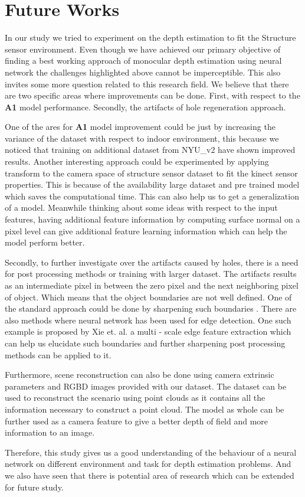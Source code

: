 

\chapter{Future Works}

\label{Chapter8:FutureWorks}

In our study we tried to experiment on the depth estimation to fit the Structure sensor environment. Even though we have achieved our primary objective of finding a best working approach of monocular depth estimation using neural network the challenges highlighted above cannot be imperceptible. This also invites some more question related to this research field.  We believe that there are two specific areas where improvements can be done. First, with respect to the \textbf{A1} model performance. Secondly, the artifacts of hole regeneration approach.

One of the ares for \textbf{A1} model improvement could be just by increasing the variance of the dataset with respect to indoor environment, this because we noticed that training on additional dataset from NYU\_v2 have shown improved results. Another interesting approach could be experimented by applying transform to the camera space of structure sensor dataset to fit the kinect sensor properties. This is because of the availability large dataset and pre trained model which saves the computational time. This can also help us to get a generalization of a model. Meanwhile thinking about some ideas with respect to the input features, having additional feature information by computing surface normal on a pixel level can give additional feature learning information which can help the model perform better. 

Secondly, to further investigate over the artifacts caused by holes, there is a need for post processing methods or training with larger dataset. The artifacts results as an intermediate pixel in between the zero pixel and the next neighboring pixel of object. Which means that the object boundaries are not well defined. One of the standard approach could be done by sharpening such boundaries  \cite{gui2011image}. There are also methods where neural network has been used for edge detection. One such example is proposed by Xie et. al. a multi - scale edge feature extraction \cite{xie2015holistically} which can help us elucidate such boundaries and further sharpening post processing methods can be applied to it.

Furthermore, scene reconstruction can also be done using camera extrinsic parameters and RGBD images provided with our dataset. The dataset can be used to reconstruct the scenario using point clouds as it contains all the information necessary to construct a point cloud. The model as whole can be further used as a camera feature to give a better depth of field and more information to an image.

Therefore, this study gives us a good understanding of the behaviour of a neural network on different environment and task for depth estimation problems. And we also have seen that there is potential area of research which can be extended for future study. 
